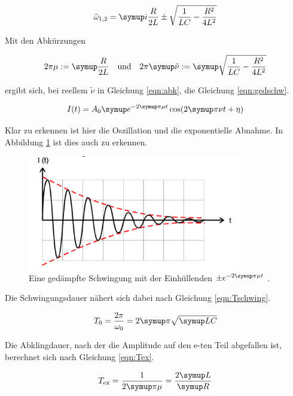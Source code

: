 \begin{equation}
  \tilde{\omega}_{1,2} = \g{i\frac{R}{2 L} \pm \sqrt{\frac{1}{L C} - \frac{R^2}{4 L^2}}}
  \label{eqn:konstant}
\end{equation}

Mit den Abkürzungen

\begin{align}
  2 \pi \mu := \g{\frac{R}{2 L}} \quad \text{und} \quad 2 \pi \g{\tilde{\nu}} := \g{\sqrt{\frac{1}{L C} - \frac{R^2}{4 L^2}}}
  \label{eqn:abk}
\end{align}

ergibt sich, bei reellem $\tilde{\nu}$ in Gleichung \eqref{eqn:abk}, die Gleichung \eqref{eqn:gedschw}.

\begin{equation}
  I(t) = A_0 \g{e}^{-2 \g{\pi} \mu t} \cos(2 \g{\pi} \nu t + \eta)
  \label{eqn:gedschw}
\end{equation}

Klar zu erkennen ist hier die Oszillation und die exponentielle Abnahme.
In Abbildung \ref{fig:gedschw} ist dies auch zu erkennen.

\begin{figure}[h]
  \centering
  \includegraphics[height = 5cm]{gedschw.pdf}
  \caption{Eine gedämpfte Schwingung mit der Einhüllenden $\pm e^{-2\g{\pi}\mu t}$ \cite{anleitung}.}
  \label{fig:gedschw}
\end{figure}

Die Schwingungsdauer nähert sich dabei nach Gleichung \eqref{eqn:Tschwing}.

\begin{equation}
  T_{\text{0}} = \frac{2 \pi}{\omega_0} = 2 \g{\pi}\sqrt{\g{LC}}
  \label{eqn:Tschwing}
\end{equation}

Die Abklingdauer, nach der die Amplitude auf den e-ten Teil abgefallen ist,
berechnet sich nach Gleichung \eqref{eqn:Tex}.

\begin{equation}
  T_{\text{ex}} = \frac{1}{2\g{\pi}\mu} = \frac{2\g{L}}{\g{R}}
  \label{eqn:Tex}
\end{equation}

